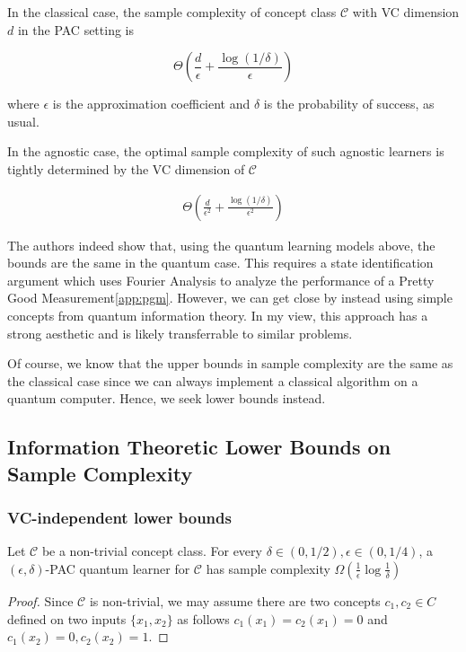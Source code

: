 \documentclass[main.tex]{subfiles}
\begin{document}
{In the classical case, the sample complexity of concept class $\mathcal{C}$ with VC dimension $d$ in the PAC setting is

$$
\Theta(\frac{d}{\epsilon} + \frac{\log(1/\delta)}{\epsilon})
$$

where $\epsilon$ is the approximation coefficient and $\delta$ is the probability of success, as usual.

In the agnostic case, the optimal sample complexity of such agnostic learners is tightly determined by the VC dimension of $\mathcal{C}$

\begin{align*}
\Theta(\frac{d}{\epsilon^2} + \frac{\log(1/\delta)}{\epsilon^2})
\end{align*}

The authors indeed show that, using the quantum learning models above, the bounds are the same in the quantum case. This requires a state identification argument which uses Fourier Analysis to analyze the performance of a Pretty Good Measurement\ref{app:pgm}. However, we can get close by instead using simple concepts from quantum information theory. In my view, this approach has a strong aesthetic and is likely transferrable to similar problems.

Of course, we know that the upper bounds in sample complexity are the same as the classical case since we can always implement a classical algorithm on a quantum computer. Hence, we seek lower bounds instead. 

\subsection{Information Theoretic Lower Bounds on Sample Complexity}

\subsubsection{VC-independent lower bounds}

\begin{lemma}
Let $\mathcal{C}$ be a non-trivial concept class. For every $\delta \in (0,1/2), \epsilon \in (0,1/4)$, a $(\epsilon,\delta)$-PAC quantum learner for $\mathcal{C}$ has sample complexity $\Omega(\frac{1}{\epsilon}\log \frac{1}{\delta})$
\end{lemma}

\begin{proof} 
Since $\mathcal{C}$ is non-trivial, we may assume there are two concepts $c_1,c_2 \in C$ defined on two inputs $\{x_1,x_2\}$ as follows $c_1(x_1) = c_2(x_1) = 0$ and $c_1(x_2) = 0,c_2(x_2) = 1$.


\end{proof}}
\end{document}
